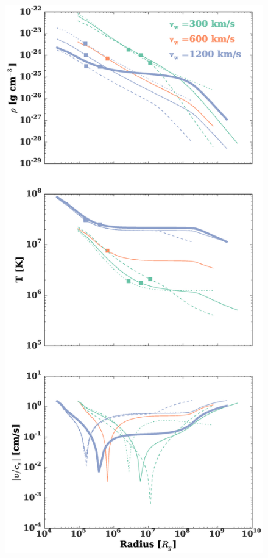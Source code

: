 \documentclass[usenatbib,fleqn]{mn2e}
\newcommand\lsim{\mathrel{\rlap{\lower4pt\hbox{\hskip1pt$\sim$}}
    \raise1pt\hbox{$<$}}}
\newcommand\gsim{\mathrel{\rlap{\lower4pt\hbox{\hskip1pt$\sim$}}
    \raise1pt\hbox{$>$}}}
\begin{document}


\begin{figure}
  \includegraphics[width=\columnwidth]{profiles.eps}

\end{figure}
\end{document}
